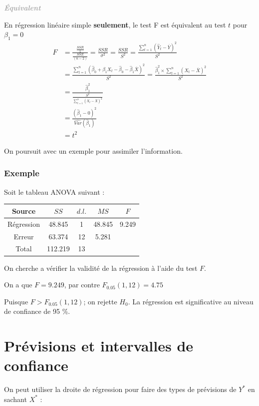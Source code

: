 \documentclass[11pt,french]{report}
\newenvironment{moreInfo}[1]
	{\begin{mdframed}
	\textcolor{darkgray}{\huge \raisebox{-3.5pt}{\faInfo} 
	\hspace{0.5cm} \large\bfseries #1}\\[5pt]
	\normalsize
	\makebox[0.1\textwidth][l]{}	
	\begin{minipage}{10cm}}
	{	\end{minipage}
	\end{mdframed}}
\begin{document}
\begin{moreInfo}{\emph{Équivalent}}
\label{equivalent}
	En régression linéaire simple \textbf{seulement}, le test F est équivalent au test $t$ pour $\beta_1 = 0$
	\begin{align*}
	F &= \frac{\frac{SSR}{1}}{\frac{SSE}{(n-2)}} = \frac{SSR}{\sigma^2} = \frac{SSR}{S^2} = \frac{\sum_{t=1}^n (\hat{Y}_t - \overline{Y})^2}{S^2} \\
	&= \frac{\sum_{t=1}^n(\hat{\beta}_0 + \hat{\beta}_1X_t - \hat{\beta}_0 - \hat{\beta}_1\overline{X})^2}{S^2} = \frac{\hat{\beta}_1^2 \times \sum_{t=1}^n(X_t - \overline{X})^2}{S^2} \\
	&= \frac{\hat{\beta}_1^2}{\frac{S^2}{\sum_{t=1}^n(X_t - \overline{X})^2}} \\
	&= \frac{(\hat{\beta}_1 - 0)^2}{\widehat{Var}(\hat{\beta}_1)} \\
	&= t^2
	\end{align*}
\end{moreInfo}

\bigskip
On poursuit avec un exemple pour assimiler l'information.

\subsubsection*{Exemple}
Soit le tableau ANOVA suivant :
\begin{center}
\begin{tabular}{|c|c|c|c|c|}
\hline
Source & $SS$ & $d.l.$ & $MS$ & $F$ \\
\hline
Régression & 48.845 & 1 & 48.845 & 9.249 \\
Erreur & 63.374 & 12 & 5.281 & \\
\hline
Total & 112.219 & 13 & & \\
\hline
\end{tabular}
\end{center}
On cherche a vérifier la validité de la régression à l'aide du test $F$. \newline

On a que $F = 9.249$, par contre $F_{0.05}(1, 12) = 4.75$ \newline

Puisque $F>F_{0.05}(1, 12)$; on rejette $H_0$. La régression est significative au niveau de confiance de 95 \%. \newline


\section{Prévisions et intervalles de confiance}
On peut utiliser la droite de régression pour faire des types de prévisions de $Y^*$ en sachant $X^*$ :
\end{document}
